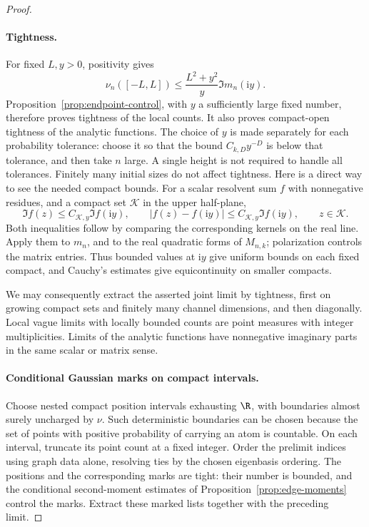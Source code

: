 \begin{proof}
\leavevmode
\paragraph{Tightness.}
For fixed \(L,y>0\), positivity gives
\[
 \nu_n([-L,L])\le \frac{L^2+y^2}{y}\Im m_n(\mathrm i y).
\]
Proposition~\ref{prop:endpoint-control}, with \(y\) a sufficiently
large fixed number, therefore proves tightness of the local counts.
It also proves compact-open tightness of the analytic functions.
The choice of \(y\) is made separately for each probability tolerance:
choose it so that the bound \(C_{k,D}y^{-D}\) is below that tolerance,
and then take \(n\) large. A single height is not required to handle
all tolerances. Finitely many initial sizes do not affect tightness.
Here is a direct way to see the needed compact bounds. For a scalar
resolvent sum \(f\) with nonnegative residues, and a compact set
\(\mathcal K\) in the upper half-plane,
\[
 \Im f(z)\le C_{\mathcal K,y}\Im f(\mathrm i y),
 \qquad
 |f(z)-f(\mathrm i y)|
 \le C_{\mathcal K,y}\Im f(\mathrm i y),
 \qquad z\in\mathcal K.
\]
Both inequalities follow by comparing the corresponding kernels on
the real line. Apply them to \(m_n\), and to the real quadratic forms
of \(M_{n,k}\); polarization controls the matrix entries. Thus bounded
values at \(\mathrm i y\) give uniform bounds on each fixed compact,
and Cauchy's estimates give equicontinuity on smaller compacts.

We may consequently extract the asserted joint limit by tightness,
first on growing compact sets and finitely many channel dimensions,
and then diagonally. Local vague limits with locally bounded counts
are point measures with integer multiplicities. Limits of the
analytic functions have nonnegative imaginary parts in the same
scalar or matrix sense.

\paragraph{Conditional Gaussian marks on compact intervals.}
Choose nested compact position intervals exhausting \(\R\), with
boundaries almost surely uncharged by \(\nu\). Such deterministic
boundaries can be chosen because the set of points with positive
probability of carrying an atom is countable. On each interval,
truncate its point count at a fixed integer. Order the prelimit
indices using graph data alone, resolving ties by the chosen
eigenbasis ordering. The positions and the corresponding marks are
tight: their number is bounded, and the conditional second-moment
estimates of Proposition~\ref{prop:edge-moments} control the marks.
Extract these marked lists together with the preceding limit.


\end{proof}
